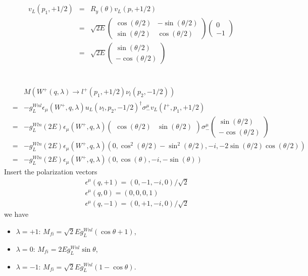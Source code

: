 \documentclass[11pt]{article}
\def\eps{\epsilon}
\def\lmd{\lambda}
\def\th{\theta}
\begin{document}
\section{ }
\begin{eqnarray}
    v_L(p_1,+1/2) &=& R_y(\theta) v_L(p,+1/2)  \\
    &=&\sqrt{2E}
    \begin{pmatrix}
        \cos(\th/2) & -\sin(\th/2)\\
        \sin(\th/2) &  \cos(\th/2)
    \end{pmatrix}
    \begin{pmatrix}
        0 \\ -1
    \end{pmatrix}\\
    &=& \sqrt{2E}
    \begin{pmatrix}
        \sin(\th/2) \\ -\cos(\th/2)
    \end{pmatrix}\label{eq.18_51}
\end{eqnarray}

\section{ }
\begin{eqnarray}
    &&M(W^+(q,\lmd) \to l^+(p_1,+1/2) \nu_l(p_2,-1/2)) \\ 
    &=& -g_L^{Wnl} \eps_\mu(W^+,q,\lmd) u_L(\nu_l,p_2,-1/2)^\dagger \sigma_-^\mu v_L(l^+,p_1,+1/2) \\
    &=& -g_L^{Wln} (2E) \eps_\mu(W^+,q,\lmd) 
    \begin{pmatrix}
        \cos(\th/2)&\sin(\th/2)
    \end{pmatrix}
    \sigma_-^\mu
    \begin{pmatrix}
        \sin(\th/2)\\ -\cos(\th/2)
    \end{pmatrix}\\
    &=& -g_L^{Wln} (2E)
    \eps_\mu(W^+,q,\lmd)
    ( 0, \cos^2(\th/2)-\sin^2(\th/2), -i, -2\sin(\th/2)\cos(\th/2) ) \\
    &=&-g_L^{Wln} (2E)
    \eps_\mu(W^+,q,\lmd)
    ( 0, \cos(\theta), -i, -\sin(\theta) )
\end{eqnarray}
Insert the polarization vectors
\begin{eqnarray}
    &&\eps^\mu(q,+1) = ( 0, -1, -i, 0 )/\sqrt2  \\
    &&\eps^\mu(q, 0) = ( 0,  0,  0, 1 ) \\
    && \eps^\mu(q,-1) = ( 0, +1, -i, 0 )/\sqrt2 
\end{eqnarray}
we have
\begin{itemize}
    \item $\lambda=+1$: $M_{fi}=\sqrt{2}E g_L^{Wnl} (\cos\th+1)$,
    \item $\lambda=0$: $M_{fi}=2E g_L^{Wnl} \sin\th$,
    \item $\lambda=-1$: $M_{fi}=\sqrt{2}E g_L^{Wnl} (1-\cos\th)$.
\end{itemize}
\end{document}
